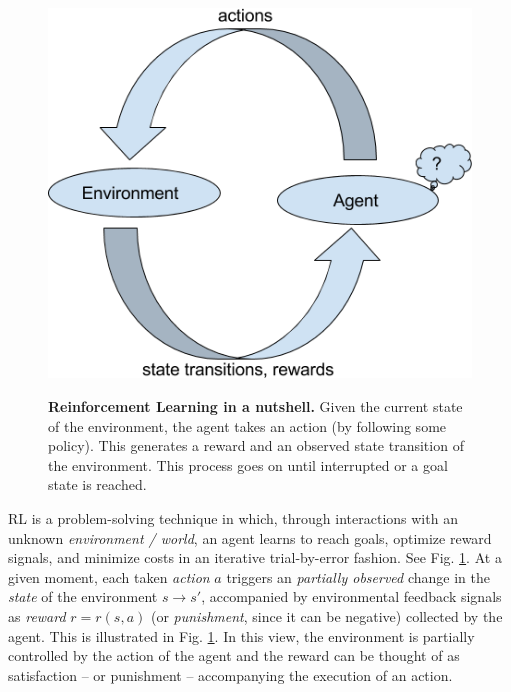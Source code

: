 \documentclass[10pt,letterpaper]{article}
\begin{document}
\begin{figure}
  \caption{\textbf{Reinforcement Learning in a nutshell.} Given the current state of the environment,
    the agent takes an action (by following some policy). This generates a reward and an observed
    state transition of the environment. This process goes on until interrupted or a goal state is reached.}
  \centering
  \includegraphics[width=1.\linewidth]{rl.png}
  \label{fig:rl}
\end{figure}


RL is a problem-solving technique in which, through interactions with an unknown \textit{environment / world},
an agent learns to reach goals, optimize reward signals, and minimize costs
in an iterative trial-by-error fashion. See Fig. \ref{fig:rl}.
At a given moment, each taken \textit{action} $a$ triggers an \textit{partially observed} change
in the \textit{state} of the environment
$s \rightarrow s'$, accompanied by environmental feedback signals as \textit{reward}
$r = r(s, a)$ (or \textit{punishment},
since it can be negative) collected by the
agent. This is illustrated in Fig. \ref{fig:rl}.
In this view, the environment is partially controlled by
the action of the agent and the reward can be thought
of as satisfaction -- or punishment -- accompanying the execution of
an action.
\end{document}
